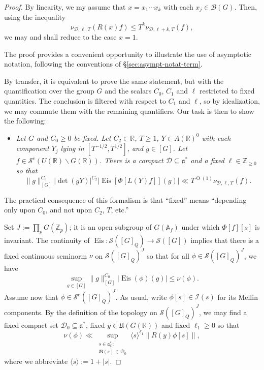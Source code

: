 \documentclass[reqno]{amsart}
\def\O{\operatorname{O}}
\DeclareMathOperator{\Eis}{Eis}
\theoremstyle{plain} \newtheorem{theorem} {Theorem}
\theoremstyle{definition} \newtheorem{definition} [theorem] {Definition}
\theoremstyle{itplain} %
\numberwithin{equation}{section}
\numberwithin{theorem}{section}
\renewcommand{\geq}{\geqslant}
\renewcommand{\leq}{\leqslant}
\begin{document}
\begin{proof}
By linearity, we my assume that $x = x_1 \dotsb x_k$ with each $x_j \in \mathcal{B}(G)$.  Then, using the inequality
\begin{equation*}
  \nu_{\mathcal{D},\ell,T}(R(x) f) \leq
  T^k
  \nu_{\mathcal{D},\ell + k, T}(f),
\end{equation*}
we may and shall reduce to the case $x = 1$.

The proof provides a convenient opportunity to illustrate the use of asymptotic notation, following the conventions of \S\ref{sec:asympt-notat-term}.

By transfer, it is equivalent to prove the same statement, but with the quantification over the group $G$ and the scalars $C_0$, $C_1$ and $\ell$ restricted to fixed quantities.  The conclusion is filtered with respect to $C_1$ and $\ell$, so by idealization, we may commute them with the remaining quantifiers.  Our task is then to show the following:
\begin{itemize}
\item \emph{Let $G$ and $C_0 \geq 0$ be fixed.  Let $C_2 \in \mathbb{R}$, $T \geq 1$, $Y \in A(\mathbb{R})^0$ with each component $Y_j$ lying in $[T^{-1/2}, T^{1/2}]$, and $g \in [G]$.  Let $f \in \mathcal{S}^e(U(\mathbb{R}) \backslash G(\mathbb{R}))$.  There is a compact $\mathcal{D} \subseteq \mathfrak{a}^*$ and a fixed $\ell \in \mathbb{Z}_{\geq 0}$ so that}
  \begin{equation}\label{eq:g_gc_0-leftlv-detg}
    \|g\|_{[G]}^{C_0} 
    \left\lvert     \det(g Y) \right\rvert^{C_2}
    \left\lvert \Eis[\Phi[ L(Y) f]](g) \right\rvert
    \ll T^{\O(1)} \nu_{\mathcal{D},\ell,T}(f).
  \end{equation}
\end{itemize}
The practical consequence of this formalism is that ``fixed'' means ``depending only upon $C_0$, and not upon $C_2$, $T$, etc.''

Set $J := \prod_p G(\mathbb{Z}_p)$; it is an open subgroup of $G(\mathbb{A}_f)$ under which $\Phi[f][s]$ is invariant.  The continuity of $\Eis : \mathcal{S}([G]_Q) \rightarrow \mathcal{S}([G])$ implies that there is a fixed continuous seminorm $\nu$ on $\mathcal{S}([G]_Q)^J$ so that for all $\phi \in \mathcal{S}([G]_Q)^J$, we have
\begin{equation}\label{eq:sup-_g-in}
  \sup _{g \in [G]} \|g\| ^{C_0} _{[G]} | \Eis(\phi) (g)| \leq \nu(\phi).
\end{equation}
Assume now that $\phi \in \mathcal{S}^e([G]_Q)^J$.  As usual, write $\phi[s] \in \mathcal{I}(s)$ for its Mellin components.  By the definition of the topology on $\mathcal{S}([G]_Q)^J$, we may find a fixed compact set $\mathcal{D}_0  \subseteq \mathfrak{a}^*$, fixed $y \in \mathfrak{U}(G(\mathbb{R}))$ and fixed $\ell_1 \geq 0$ so that
\begin{equation}\label{eq:nuphi-ll-sup}
  \nu(\phi) \ll \sup_{
    \substack{
      s \in \mathfrak{a}_{\mathbb{C}}^* :
      \\
      \Re(s) \in \mathcal{D}_0
    }
  }
  \langle s \rangle^{\ell_1} \|R(y) \phi[s]\|,
\end{equation}
where we abbreviate $\langle s \rangle := 1 + |s|$.


\end{proof}
\end{document}
